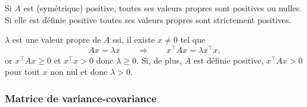 \begin{proposition}
  Si $A$ est (symétrique) positive, toutes ses valeurs propres sont positives ou nulles. \\
  Si elle est définie positive toutes ses valeurs propres sont strictement positives.
\end{proposition}

\proof
$\lambda$ est une valeur propre de $A$ ssi, il existe $x \neq 0$ tel que
$$
Ax = \lambda x \qquad \Rightarrow \qquad x^\top A x = \lambda x^\top x,
$$
or $x^\top A x \geq 0$ et $x^\top x > 0$ donc $\lambda \geq 0$. Si, de plus, $A$ est définie positive, $x^\top A x > 0$ pour tout $x$ non nul et donc $\lambda > 0$.
\eproof

% 



\subsubsection{Matrice de variance-covariance}

